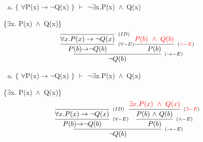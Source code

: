 \documentclass[aspectratio=43]{beamer}
\newcommand{\ria}{$\rightarrow$}
\newcommand{\fall}{$\forall$}
\newcommand{\ex}{$\exists$}
\newcommand{\nao}{$\neg$}
\newcommand{\nex}{\nao\ex}
\newcommand{\andd}{$\wedge$}
\begin{document}
    \begin{frame}[fragile]
    	
    	\begin{enumerate}[b)]
			
			\item $\{$ \fall P(x)\ria \nao Q(x) $\}$ $\vdash$ \nex  x.P(x)\ \andd\ Q(x) \\ 
			
		\end{enumerate}
        \{\ex  x. P(x)\ \andd\ Q(x)\}
        \vspace{90pt}
        \[
        \begin{array}{c}
		
        	\infer[_{(\to-E)}]
            {$\nao$ Q(b)}
            {\infer[_{(\forall-E)}] 
            	{P(b) $\ria$ $\nao$ Q(b)}
               	{\infer[_{(ID)}]
                	{\forall x.P(x)\to \neg Q(x)}
                    {}
                } 
            \infer[_{(\textcolor{red}{\land-E})}] 
                {P(b)} 
                {\textcolor{red}{P(b)\ \wedge\ Q(b)}}
            }
		\end{array}
        \]
        
	\end{frame}
    
    
    \begin{frame}[fragile]
    	
    	\begin{enumerate}[b)]
			
			\item $\{$ \fall P(x)\ria \nao Q(x) $\}$ $\vdash$ \nex  x.P(x)\ \andd\ Q(x) \\ 
			
		\end{enumerate}
        \{\ex  x. P(x)\ \andd\ Q(x)\}
        \vspace{90pt}
        \[
        \begin{array}{c}
		
        	\infer[_{(\to-E)}]
            {$\nao$ Q(b)}
            {\infer[_{(\forall-E)}] 
            	{P(b) $\ria$ $\nao$ Q(b)}
               	{\infer[_{(ID)}]
                	{\forall x.P(x)\to \neg Q(x)}
                    {}
                } 
            \infer[_{(\land-E)}] 
                {P(b)} 
                {\infer[_{(\textcolor{red}{\exists-E})}] 
                        	{P(b)\ $\andd$\ Q(b)}
                        	{\textcolor{red}{\exists x.P(x)\ \wedge\ Q(x)}}
                }
            }
		\end{array}
        \]
        
	\end{frame}
    
\end{document}
